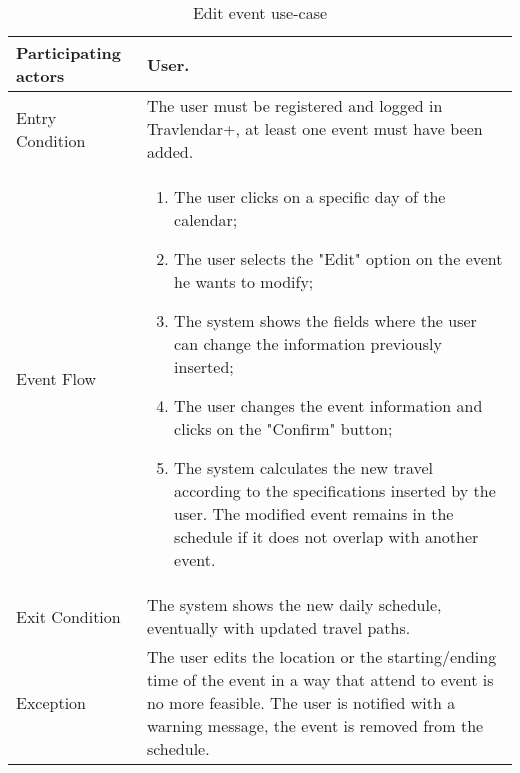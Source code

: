 \begin{table}[H]
	\begin{center}
		\begin{tabular}{ | p{} | p{} | }
		\hline
		Participating actors &  User.\\
		\hline
		Entry Condition & The user must be registered and logged in Travlendar+, at least one event must have been added.\\
		\hline
		Event Flow & 
			\begin{enumerate}
				\item The user clicks on a specific day of the calendar;
				\item The user selects the "Edit" option on the event he wants to modify;
				\item The system shows the fields where the user can change the information previously inserted;
				\item The user changes the event information and clicks on the "Confirm" button;
				\item The system calculates the new travel according to the specifications inserted by the user. The modified event remains in the schedule if it does not overlap with another event.
			\end{enumerate} \\
		\hline
		Exit Condition & The system shows the new daily schedule, eventually with updated travel paths. \\
		\hline
		Exception & The user edits the location or the starting/ending time of the event in a way that attend to event is no more feasible. The user is notified with a warning message, the event is removed from the schedule.\\ 
		\hline
		\end{tabular}
	\end{center}
	\caption{Edit event use-case}
\end{table}